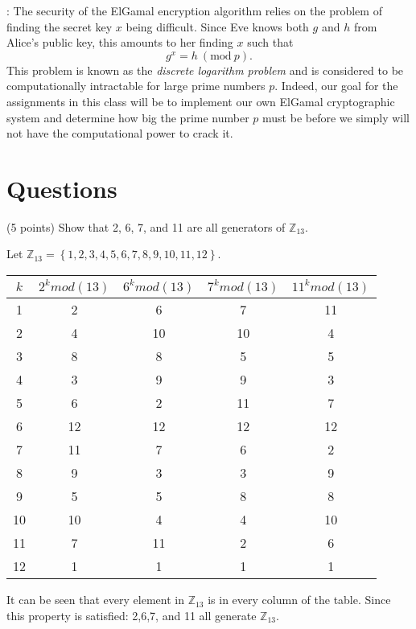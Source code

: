 \documentclass{article}
\newcommand{\myhrule}{ \begin{center}\rule{.9\linewidth}{.25mm}\end{center} }
\newcommand{\pad}{\vspace{8pt}\noindent}
\newcommand{\Mod}[1]{\ (\mathrm{mod}\ #1)}
\begin{document}
\pad{\bf Security}:
The security of the ElGamal encryption algorithm relies on the problem of finding the secret key $x$ being difficult. Since Eve knows both $g$ and $h$ from Alice's public key, this amounts to her finding $x$ such that 
\[
g^x = h\Mod{p}.
\]
This problem is known as the {\em discrete logarithm problem} and is considered to be computationally intractable for large prime numbers $p$. Indeed, our goal for the assignments in this class will be to implement our own ElGamal cryptographic system and determine how big the prime number $p$ must be before we simply will not have the computational power to crack it. 


\section*{Questions}

(5 points) Show that 2, 6, 7, and 11 are all generators of $\mathbb{Z}_{13}$.
\vspace*{1em}

Let $\mathbb{Z}_{13} = \left\{1,2,3,4,5,6,7,8,9,10,11,12\right\}$.
\begin{center}
    \begin{tabular}{|| c c c c c ||}
    \hline
    $k$ & $2^k mod(13)$ & $6^k mod(13)$ & $7^k mod(13)$ & $11^k mod(13)$ \\ [0.5ex]
    \hline \hline
        1 &  2  & 6 & 7 & 11\\
        2 & 4 & 10 & 10 & 4\\
        3 & 8 & 8 & 5 & 5\\
        4 & 3 & 9 & 9 & 3\\
        5 & 6 & 2 & 11 & 7\\
        6 & 12 & 12 & 12 & 12\\
        7 & 11 & 7 & 6 & 2\\
        8 & 9 & 3 & 3 & 9\\
        9 & 5 & 5 & 8 & 8\\
        10 & 10 & 4 & 4 & 10\\
        11 & 7 & 11 & 2 & 6\\
        12 & 1 & 1 & 1 & 1\\
    \hline
    \end{tabular}
\end{center}
It can be seen that every element in $\mathbb{Z}_13$ is in every column of the table. Since this property is satisfied: 2,6,7, and 11 all generate $\mathbb{Z}_13$.
\end{document}
